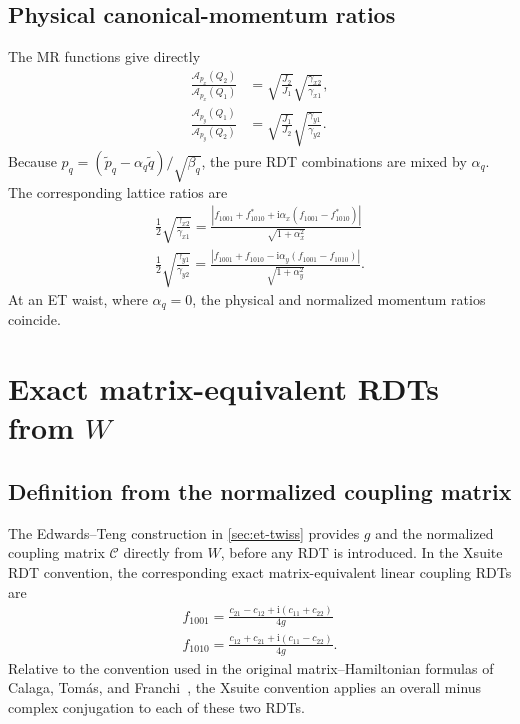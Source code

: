 \documentclass[11pt,a4paper]{article}
\newcommand{\ii}{\mathrm{i}}
\newcommand{\fminus}{f_{1001}}
\newcommand{\fplus}{f_{1010}}
\begin{document}
\subsection{Physical canonical-momentum ratios}

The MR functions give directly
\begin{align}
 \frac{\mathcal A_{p_x}(Q_2)}{\mathcal A_{p_x}(Q_1)}
 &=\sqrt{\frac{J_2}{J_1}}
   \sqrt{\frac{\gamma_{x2}}{\gamma_{x1}}},\\
 \frac{\mathcal A_{p_y}(Q_1)}{\mathcal A_{p_y}(Q_2)}
 &=\sqrt{\frac{J_1}{J_2}}
   \sqrt{\frac{\gamma_{y1}}{\gamma_{y2}}}.
\end{align}
Because $p_q=(\widetilde p_q-\alpha_q\widetilde q)/\sqrt{\beta_q}$, the pure RDT combinations are mixed by $\alpha_q$.  The corresponding lattice ratios are
\begin{align}
 \boxed{
 \frac12\sqrt{\frac{\gamma_{x2}}{\gamma_{x1}}}
 =\frac{
  \left|\fminus+\fplus^{*}+\ii\alpha_x(\fminus-\fplus^{*})\right|
 }{\sqrt{1+\alpha_x^2}}
 }
 \label{eq:physical-px-ratio}\\
 \boxed{
 \frac12\sqrt{\frac{\gamma_{y1}}{\gamma_{y2}}}
 =\frac{
  \left|\fminus+\fplus-\ii\alpha_y(\fminus-\fplus)\right|
 }{\sqrt{1+\alpha_y^2}}
 .}
 \label{eq:physical-py-ratio}
\end{align}
At an ET waist, where $\alpha_q=0$, the physical and normalized momentum ratios coincide.

\section{Exact matrix-equivalent RDTs from $W$}
\label{sec:matrix-rdt}

\subsection{Definition from the normalized coupling matrix}

The Edwards--Teng construction in \cref{sec:et-twiss} provides $g$ and the
normalized coupling matrix $\mathcal C$ directly from $W$, before any RDT is
introduced.  In the Xsuite RDT convention, the corresponding exact
matrix-equivalent linear coupling RDTs are
\begin{align}
 \boxed{
 f_{1001}=\frac{
  c_{21}-c_{12}+\ii(c_{11}+c_{22})
 }{4g}
 }
 \label{eq:f1001-from-c}\\
 \boxed{
 f_{1010}=\frac{
  c_{12}+c_{21}+\ii(c_{11}-c_{22})
 }{4g}.
 }
 \label{eq:f1010-from-c}
\end{align}
Relative to the convention used in the original matrix--Hamiltonian formulas of Calaga, Tom\'as, and Franchi~\cite{CalagaTomasFranchi}, the Xsuite convention applies an overall minus complex conjugation to each of these two RDTs.
\end{document}
